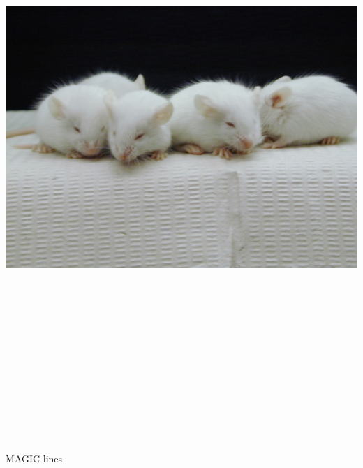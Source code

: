 \documentclass[12pt]{article}
\newcommand{\headsize}{\fontsize{35}{35} \selectfont}
\begin{document}
\newpage

\thispagestyle{empty}

\vspace*{-0.85in}

\centerline{\includegraphics[height=9in]{Figs/inbredmice.jpg}}




\newpage

\headsize \color{myyellow}
\hfill \begin{minipage}{5.75in}
\centering
MAGIC lines
\end{minipage}
\end{document}
